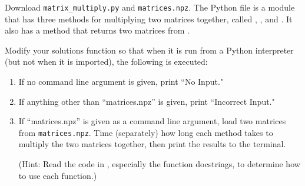 \begin{problem}
Download \texttt{matrix\_multiply.py} and \texttt{matrices.npz}.
The Python file  is a module that has three methods for multiplying two matrices together, called , , and .
It also has a  method that returns two matrices from .

Modify your solutions function so that when it is run from a Python interpreter (but not when it is imported), the following is executed:
\begin{enumerate}
\item If no command line argument is given, print ``No Input."
\item If anything other than ``matrices.npz'' is given, print ``Incorrect Input."
\item If ``matrices.npz'' is given as a command line argument, load two matrices from \texttt{matrices.npz}. Time (separately) how long each method takes to multiply the two matrices together, then print the results to the terminal.

(Hint: Read the code in , especially the function docstrings, to determine how to use each function.)
\end{enumerate}
\end{problem}
